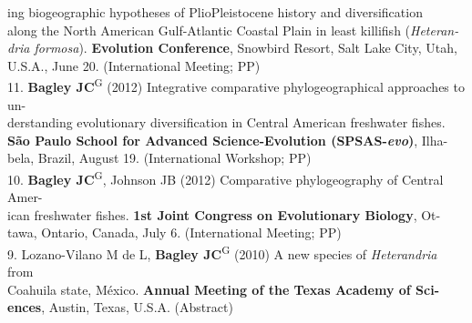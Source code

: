\documentclass[margin,line]{res}
\begin{document}
\begin{resume}
\hspace*{8mm} ing biogeographic hypotheses of Plio\textemdash Pleistocene history and diversification\\
\hspace*{8mm} along the North American Gulf-Atlantic Coastal Plain in least killifish (\emph{Heteran-}\\
\hspace*{8mm} \emph{dria formosa}). \textbf{Evolution Conference}, Snowbird Resort, Salt Lake City, Utah,\\ \vspace{2mm}
\hspace*{8mm}U.S.A., June 20. (International Meeting; PP) \\
11. \textbf{Bagley JC}\textsuperscript{G} (2012) Integrative comparative phylogeographical approaches to un-\\
\hspace*{8mm} derstanding evolutionary diversification in Central American freshwater fishes.\\
\hspace*{8mm} \textbf{S\~{a}o Paulo School for Advanced Science-Evolution (SPSAS-\emph{evo})}, Ilha-\\ \vspace{2mm}
\hspace*{8mm}bela, Brazil, August 19. (International Workshop; PP) \\
10. \textbf{Bagley JC}\textsuperscript{G}, Johnson JB (2012) Comparative phylogeography of Central Amer-\\
\hspace*{8mm} ican freshwater fishes. \textbf{1st Joint Congress on Evolutionary Biology}, Ot-\\ \vspace{2mm}
\hspace*{8mm}tawa, Ontario, Canada, July 6. (International Meeting; PP) \\
9. Lozano-Vilano M de L, \textbf{Bagley JC}\textsuperscript{G} (2010) A new species of \emph{Heterandria} from\\
\hspace*{8mm} Coahuila state, M\'{e}xico. \textbf{Annual Meeting of the Texas Academy of Sci-}\\ \vspace{2mm}
\hspace*{8mm}\textbf{ences}, Austin, Texas, U.S.A. (Abstract) \\

\end{resume}
\end{document}
